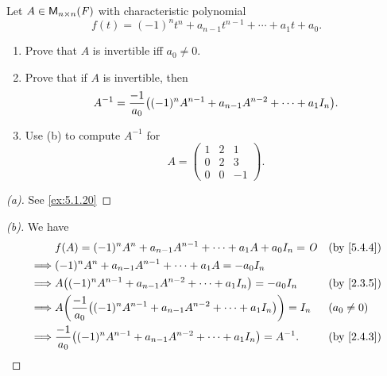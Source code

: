 \begin{ex}\label{ex:5.4.18}
	Let \(A \in \mathsf{M}_{{n} \times n}({\mathit{F}})\) with characteristic polynomial
	\[
		f(t) = (-1)^n t^n + a_{n - 1} t^{n - 1} + \cdots + a_1 t + a_0.
	\]
	\begin{enumerate}
		\item Prove that \(A\) is invertible iff \(a_0 \neq 0\).
		\item Prove that if \(A\) is invertible, then
		      \[
			      A^{-1} = \frac{-1}{a_0} \pa{(-1)^n A^{n - 1} + a_{n - 1} A^{n - 2} + \cdots + a_1 I_n}.
		      \]
		\item Use (b) to compute \(A^{-1}\) for
		      \[
			      A = \begin{pmatrix}
				      1 & 2 & 1  \\
				      0 & 2 & 3  \\
				      0 & 0 & -1
			      \end{pmatrix}.
		      \]
	\end{enumerate}
\end{ex}

\begin{proof}[(a)]
	See \cref{ex:5.1.20}
\end{proof}

\begin{proof}[(b)]
	We have
	\begin{align*}
		         & f(A) = (-1)^n A^n + a_{n - 1} A^{n - 1} + \cdots + a_1 A + a_0 I_n = \zm                   &  & \by{5.4.4}   \\
		\implies & (-1)^n A^n + a_{n - 1} A^{n - 1} + \cdots + a_1 A = -a_0 I_n                                                 \\
		\implies & A \pa{(-1)^n A^{n - 1} + a_{n - 1} A^{n - 2} + \cdots + a_1 I_n} = -a_0 I_n                &  & \by{2.3.5}   \\
		\implies & A \pa{\frac{-1}{a_0} \pa{(-1)^n A^{n - 1} + a_{n - 1} A^{n - 2} + \cdots + a_1 I_n}} = I_n &  & (a_0 \neq 0) \\
		\implies & \frac{-1}{a_0} \pa{(-1)^n A^{n - 1} + a_{n - 1} A^{n - 2} + \cdots + a_1 I_n} = A^{-1}.    &  & \by{2.4.3}
	\end{align*}
\end{proof}

